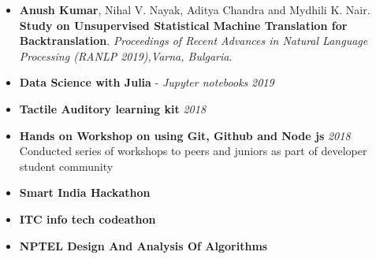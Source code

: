 \documentclass[11pt,a4paper]{article}
\begin{document}
\colorbox{gray}{}
\begin{itemize}
    \item \textbf{Anush Kumar}, Nihal V. Nayak, Aditya Chandra and Mydhili K. Nair. \textbf{Study on Unsupervised Statistical Machine Translation for Backtranslation}. \textit{Proceedings of Recent Advances in Natural Language Processing (RANLP 2019),Varna, Bulgaria}. 
\end{itemize}

\colorbox{gray}{}
\begin{itemize}
    \item \textbf{Data Science with Julia} - \textit{Jupyter notebooks} \hfill \textit{2019}
    \item \textbf{Tactile Auditory learning kit} \hfill \textit{2018}
\end{itemize}

\colorbox{gray}{}
\begin{itemize}
    \item \textbf{Hands on Workshop on using  Git, Github and Node js} \hfill \textit{2018}
    \\Conducted series of workshops to peers and juniors as part of developer student community
\end{itemize}

\colorbox{gray}{}
\begin{itemize}
    \item \textbf{Smart India Hackathon}
    \item \textbf{ITC info tech codeathon}
    \item \textbf{NPTEL Design And Analysis Of Algorithms}
\end{itemize}
  
\end{document}
